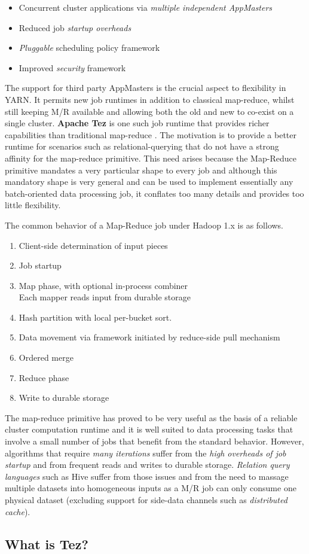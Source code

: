\documentclass[twocolumn]{article}
\newcommand{\bi}{\begin{itemize}}
\newcommand{\ei}{\end{itemize}}
\newcommand{\be}{\begin{enumerate}}
\newcommand{\ee}{\end{enumerate}}
\newcommand{\ii}{\item}
\begin{document}
\bi
\ii Concurrent cluster applications via \textit{multiple independent AppMasters}
\ii Reduced job \textit{startup overheads}
\ii \textit{Pluggable} scheduling policy framework
\ii Improved \textit{security} framework
\ei

The support for third party AppMasters is the crucial aspect to flexibility in YARN.  It permits new job runtimes in addition to classical map-reduce, whilst still keeping M/R available and allowing both the old and new to co-exist on a single cluster.  \textbf{Apache Tez} is one such job runtime that provides richer capabilities than traditional map-reduce \cite{hortonworks}.  The motivation is to provide a better runtime for scenarios such as relational-querying that do not have a strong affinity for the map-reduce primitive.   This need arises because the Map-Reduce primitive mandates a very particular shape to every job and although this mandatory shape is very general and can be used to implement essentially any batch-oriented data processing job, it conflates too many details and provides too little flexibility.

The common behavior of a Map-Reduce job under Hadoop 1.x is as follows.

\be
\ii Client-side determination of input pieces
\ii Job startup
\ii Map phase, with optional in-process combiner \\
Each mapper reads input from durable storage
\ii Hash partition with local per-bucket sort.
\ii Data movement via framework initiated by reduce-side pull mechanism
\ii Ordered merge
\ii Reduce phase
\ii Write to durable storage
\ee

The map-reduce primitive has proved to be very useful as the basis of a reliable cluster computation runtime and it is well suited to data processing tasks that involve a small number of jobs that benefit from the standard behavior.  However, algorithms that require \textit{many iterations} suffer from the \textit{high overheads of job startup} and from frequent reads and writes to durable storage.  \textit{Relation query languages} such as Hive suffer from those issues and from the need to massage multiple datasets into homogeneous inputs as a M/R job can only consume one physical dataset (excluding support for side-data channels such as \textit{distributed cache}).  

\subsection{What is Tez?}
\end{document}
